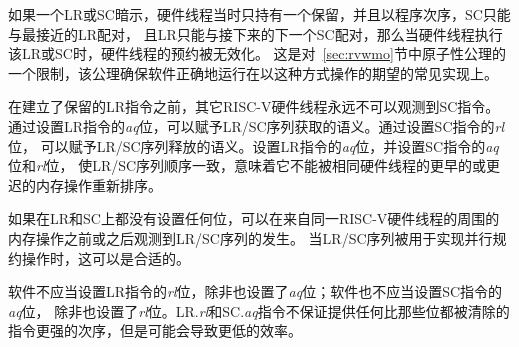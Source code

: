 \begin{commentary}
  如果一个LR或SC暗示，硬件线程当时只持有一个保留，并且以程序次序，SC只能与最接近的LR配对，
  且LR只能与接下来的下一个SC配对，那么当硬件线程执行该LR或SC时，硬件线程的预约被无效化。
  这是对~\ref{sec:rvwmo}节中原子性公理的一个限制，该公理确保软件正确地运行在以这种方式操作的期望的常见实现上。
\end{commentary}

在建立了保留的LR指令之前，其它RISC-V硬件线程永远不可以观测到SC指令。
通过设置LR指令的{\em aq}位，可以赋予LR/SC序列获取的语义。通过设置SC指令的{\em rl}位，
可以赋予LR/SC序列释放的语义。设置LR指令的{\em aq}位，并设置SC指令的{\em aq}位和{\em rl}位，
使LR/SC序列顺序一致，意味着它不能被相同硬件线程的更早的或更迟的内存操作重新排序。

如果在LR和SC上都没有设置任何位，可以在来自同一RISC-V硬件线程的周围的内存操作之前或之后观测到LR/SC序列的发生。
当LR/SC序列被用于实现并行规约操作时，这可以是合适的。

软件不应当设置LR指令的{\em rl}位，除非也设置了{\em aq}位；软件也不应当设置SC指令的{\em aq}位，
除非也设置了{\em rl}位。LR.{\em rl}和SC.{\em aq}指令不保证提供任何比那些位都被清除的指令更强的次序，但是可能会导致更低的效率。

